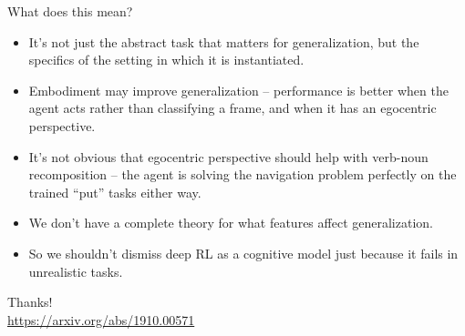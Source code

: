 \documentclass{beamer}
\begin{document}
\begin{frame}{What does this mean?}
\begin{itemize}
\item It's not just the abstract task that matters for generalization, but the specifics of the setting in which it is instantiated. 
\item Embodiment may improve generalization -- performance is better when the agent acts rather than classifying a frame, and when it has an egocentric perspective.
\item It's not obvious that egocentric perspective should help with verb-noun recomposition -- the agent is solving the navigation problem perfectly on the trained ``put'' tasks either way.
\item We don't have a complete theory for what features affect generalization.
\item So we shouldn't dismiss deep RL as a cognitive model just because it fails in unrealistic tasks. 
\end{itemize}
\end{frame}

\begin{frame}[standout]
Thanks!\\
\url{https://arxiv.org/abs/1910.00571}
\end{frame}
\end{document}
